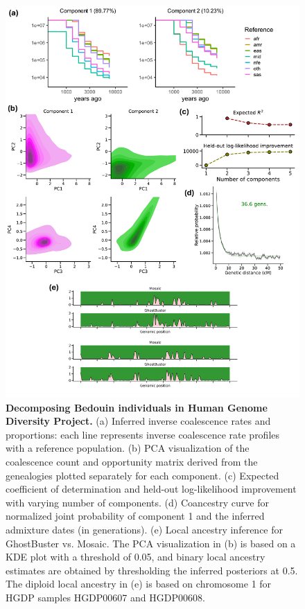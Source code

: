 \begin{figure}[h!]
    \centering
    \includegraphics[width=\linewidth]{figures/gb_sims/gb_real_bedouin.pdf}
    \captionsetup{width=\textwidth+3cm}     \caption{
    \footnotesize
    \textbf{Decomposing Bedouin individuals in Human Genome Diversity Project.} (a) Inferred inverse coalescence rates and proportions: each line represents inverse coalescence rate profiles with a reference population. (b) PCA visualization of the coalescence count and opportunity matrix derived from the genealogies plotted separately for each component. (c) Expected coefficient of determination and held-out log-likelihood improvement with varying number of components. (d) Coancestry curve for normalized joint probability of component 1 and the inferred admixture dates (in generations). (e) Local ancestry inference for GhostBuster vs. Mosaic. The PCA visualization in (b) is based on a KDE plot with a threshold of 0.05, and binary local ancestry estimates are obtained by thresholding the inferred posteriors at 0.5. The diploid local ancestry in (e) is based on chromosome 1 for HGDP samples HGDP00607 and HGDP00608.
    }
    \label{fig:gb_bedouin}
\end{figure}

